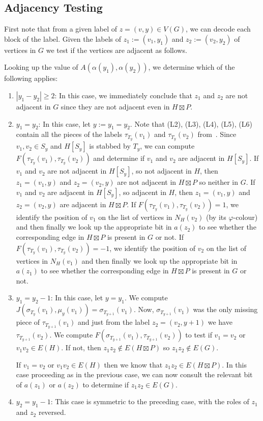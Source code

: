 \documentclass[kpfonts]{patmorin}
\let\ge\geqslant
\begin{document}
\subsection{Adjacency Testing}

First note that from a given label of $z=(v,y) \in V(G)$, we can decode each block of the label. 
Given the labels of $z_1:=(v_1,y_1)$ and $z_2:=(v_2,y_2)$ of vertices in $G$ we test if the vertices are adjacent as follows.

Looking up the value of $A(\alpha(y_1),\alpha(y_2))$, we determine which of the following applies:
\begin{enumerate}
  \item $|y_1-y_2|\ge 2$: 
  In this case, we immediately conclude that $z_1$ and $z_2$ are not adjacent in $G$ since they are not adjacent even in $H\boxtimes P$.
  \item $y_1=y_2$:  
  In this case, let $y:=y_1=y_2$. 
  Note that (L2), (L3), (L4), (L5), (L6) contain all the pieces of the labels $\tau_{T_y}(v_1)$ and $\tau_{T_y}(v_2)$ from~. 
  Since $v_1,v_2 \in S_y$ and $H[S_y]$ is stabbed by $T_y$,
  we can compute $F(\tau_{T_y}(v_1),\tau_{T_y}(v_2))$ and determine if $v_1$ and $v_2$ are adjacent in $H[S_y]$. 
  If $v_1$ and $v_2$ are not adjacent in $H[S_y]$, so not adjacent in $H$, then $z_1=(v_1,y)$ and $z_2=(v_2,y)$ are not adjacent in $H\boxtimes P$ so neither in $G$.
  If $v_1$ and $v_2$ are adjacent in $H[S_y]$, so adjacent in $H$, then $z_1=(v_1,y)$ and $z_2=(v_2,y)$ are adjacent in $H\boxtimes P$. 
  If $F(\tau_{T_y}(v_1),\tau_{T_y}(v_2))=1$, 
  we identify the position of $v_1$ on the list of vertices in $N_H(v_2)$ (by its $\varphi$-colour) 
  and then finally we look up the appropriate bit in $a(z_2)$ to see whether the corresponding edge in $H\boxtimes P$ is present in $G$ or not.
  If $F(\tau_{T_y}(v_1),\tau_{T_y}(v_2))=-1$, 
  we identify the position of $v_2$ on the list of vertices in $N_H(v_1)$
  and then finally we look up the appropriate bit in $a(z_1)$ to see whether the corresponding edge in $H\boxtimes P$ is present in $G$ or not.
  \item $y_1=y_2-1$: 
  In this case, let $y=y_1$. 
  We compute $J(\sigma_{T_y}(v_1),\mu_y(v_1))=\sigma_{T_{y+1}}(v_1)$. 
  Now, $\sigma_{T_{y+1}}(v_1)$ was the only missing piece of $\tau_{T_{y+1}}(v_1)$ and 
  just from the label $z_2=(v_2,y+1)$ we have $\tau_{T_{y+1}}(v_2)$. 
  We compute $F(\sigma_{T_{y+1}}(v_1),\tau_{T_{y+1}}(v_2))$ to test if $v_1=v_2$ or $v_1v_2\in E(H)$. 
  If not, then $z_1z_2\not\in E(H\boxtimes P)$ so $z_1z_2\not\in E(G)$.

  If $v_1=v_2$ or $v_1v_2\in E(H)$ then we know that $z_1z_2\in E(H\boxtimes P)$.  
  In this case proceeding as in the previous case, we can now consult the relevant bit of $a(z_1)$ or $a(z_2)$ to determine if $z_1z_2\in E(G)$.

  \item $y_2=y_1-1$:  This case is symmetric to the preceding case, with the roles of $z_1$ and $z_2$ reversed.
\end{enumerate}
\end{document}
